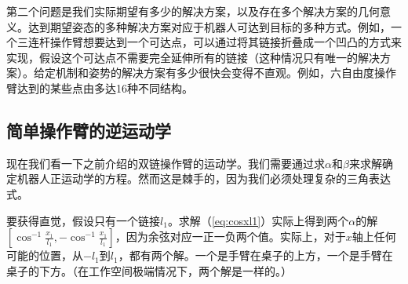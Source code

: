 第二个问题是我们实际期望有多少的解决方案，以及存在多个解决方案的几何意义。达到期望姿态的多种解决方案对应于机器人可达到目标的多种方式。例如，一个三连杆操作臂想要达到一个可达点，可以通过将其链接折叠成一个凹凸的方式来实现，假设这个可达点不需要完全延伸所有的链接（这种情况只有唯一的解决方案）。给定机制和姿势的解决方案有多少很快会变得不直观。例如，六自由度操作臂达到的某些点由多达16种不同结构。



\subsection{简单操作臂的逆运动学}
现在我们看一下之前介绍的双链操作臂的运动学。我们需要通过求$\alpha$和$\beta$来求解确定机器人正运动学的方程。然而这是棘手的，因为我们必须处理复杂的三角表达式。

要获得直觉，假设只有一个链接$l_1$。求解（\ref{eq:cosxl1}）实际上得到两个$\alpha$的解$\left[\cos^{-1}\frac{x_1}{l_1},-\cos^{-1}\frac{x_1}{l_1}\right]$，因为余弦对应一正一负两个值。实际上，对于$x$轴上任何可能的位置，从$-l_1$到$l_1$，都有两个解。一个是手臂在桌子的上方，一个是手臂在桌子的下方。（在工作空间极端情况下，两个解是一样的。）


